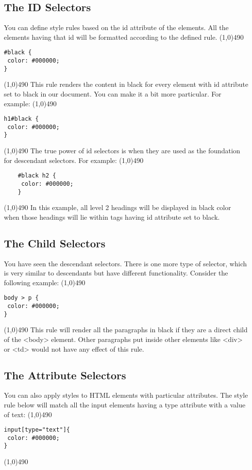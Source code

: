 \documentclass{report}
\begin{document}
    \subsection{The ID Selectors}
    \bigbreak \noindent 
    You can define style rules based on the id attribute of the elements. All the elements having that id will be formatted according to the defined rule.
    \bigbreak \noindent 
    \line(1,0){490}
    \begin{verbatim}
#black {
 color: #000000;
}
    \end{verbatim}
    \line(1,0){490}
    \bigbreak \noindent 
    This rule renders the content in black for every element with id attribute set to black in our document. You can make it a bit more particular. For example:
    \bigbreak \noindent 
    \line(1,0){490}
    \begin{verbatim}
h1#black {
 color: #000000;
}
    \end{verbatim}
    \line(1,0){490}
    \bigbreak \noindent 
    The true power of id selectors is when they are used as the foundation for
    descendant selectors. For example:
    \bigbreak \noindent 
    \line(1,0){490}
    \begin{verbatim}
    #black h2 {
     color: #000000;
    }
    \end{verbatim}
    \line(1,0){490}
    \bigbreak \noindent 
    In this example, all level 2 headings will be displayed in black color when those
    headings will lie within tags having id attribute set to black.

    \pagebreak \bigbreak \noindent 
    \subsection{The Child Selectors}
    \bigbreak \noindent 
    You have seen the descendant selectors. There is one more type of selector,
    which is very similar to descendants but have different functionality. Consider
    the following example:
    \bigbreak \noindent 
    \line(1,0){490}
\begin{verbatim}
body > p {
 color: #000000;
}
\end{verbatim}
    \line(1,0){490}
    \bigbreak \noindent 
    This rule will render all the paragraphs in black if they are a direct child of the
    <body> element. Other paragraphs put inside other elements like <div> or
    <td> would not have any effect of this rule.
    \bigbreak \noindent 
    \subsection{The Attribute Selectors}
    \bigbreak \noindent 
    You can also apply styles to HTML elements with particular attributes. The style
    rule below will match all the input elements having a type attribute with a value
    of text:
    \bigbreak \noindent 
    \line(1,0){490}
    \begin{verbatim}
input[type="text"]{
 color: #000000;
}
    \end{verbatim}
    \line(1,0){490}
    \bigbreak \noindent 
\end{document}
